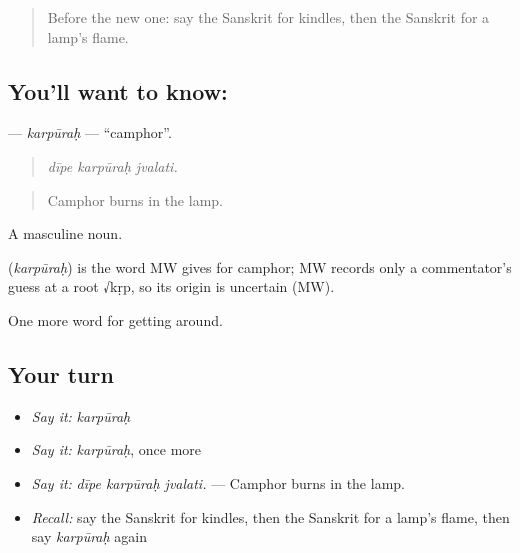 \label{lesson:SA-C397-karpurah}



\begin{quote}
Before the new one: say the Sanskrit for kindles, then the Sanskrit for a lamp's flame.
\end{quote}

\subsection*{You'll want to know: }
\textbf{} — \emph{karpūraḥ} — \textquotedblleft{}camphor\textquotedblright{}.

\begin{quote}
  
\end{quote}

\begin{quote}
\emph{dīpe karpūraḥ jvalati.}
\end{quote}

\begin{quote}
Camphor burns in the lamp.
\end{quote}

A masculine noun.

\begin{cousinweb}
\textbf{} (\emph{karpūraḥ}) is the word MW gives for camphor; MW records only a commentator's guess at a root √kṛp, so its origin is uncertain (MW).
\end{cousinweb}

\begin{grammarlens}[title={What you've built}]
One more word for getting around.
\end{grammarlens}

\subsection*{Your turn}
\begin{itemize}
\raggedright
  \item \emph{Say it:} \emph{karpūraḥ}
  \item \emph{Say it:} \emph{karpūraḥ}, once more
  \item \emph{Say it:} \emph{dīpe karpūraḥ jvalati.} — Camphor burns in the lamp.
  \item \emph{Recall:} say the Sanskrit for kindles, then the Sanskrit for a lamp's flame, then say \emph{karpūraḥ} again
\end{itemize}

